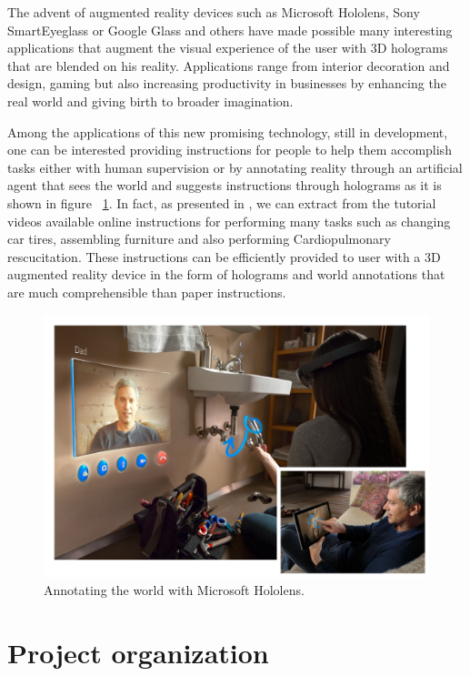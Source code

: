 \documentclass[10pt,twocolumn,letterpaper]{article}
\begin{document}
The advent of augmented reality devices such as Microsoft Hololens, Sony SmartEyeglass or Google Glass and others have made possible many interesting applications that augment the visual experience of the user with 3D holograms that are blended on his reality. Applications range from interior decoration and design, gaming but also increasing productivity in businesses by enhancing the real world and giving birth to broader imagination.

Among the applications of this new promising technology, still in development, one can be interested providing instructions for people to help them accomplish tasks either with human supervision or by annotating reality through an artificial agent that sees the world and suggests instructions through holograms as it is shown in figure ~\ref{fig:AnnotatingWorld}. In fact, as presented in \cite{alayrac_unsupervised_2015}, we can extract from the tutorial videos available online instructions for performing many tasks such as changing car tires, assembling furniture and also performing Cardiopulmonary rescucitation. These instructions can be efficiently provided to user with a 3D augmented reality device in the form of holograms and world annotations that are much comprehensible than paper instructions.

\begin{figure}[t]
\begin{center}
   \includegraphics[width=0.8\linewidth]{Annotating_world_hololens}
\end{center}
   \caption{Annotating the world with Microsoft Hololens.}
\label{fig:AnnotatingWorld}
\end{figure}

\section{Project organization}
\end{document}
